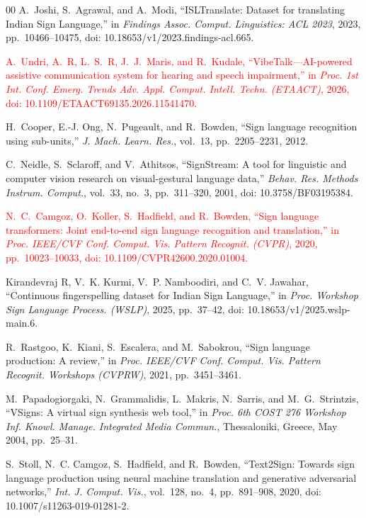 \documentclass[conference,a4paper,10pt]{IEEEtran}
\begin{document}
\begin{thebibliography}{00}
A.~Joshi, S.~Agrawal, and A.~Modi, ``ISLTranslate: Dataset for translating Indian Sign Language,'' in \emph{Findings Assoc. Comput. Linguistics: ACL 2023}, 2023, pp.~10466--10475, doi: 10.18653/v1/2023.findings-acl.665.

\textcolor{red}{A.~Undri, A.~R, L.~S.~R, J.~J.~Maris, and R.~Kudale, ``VibeTalk---AI-powered assistive communication system for hearing and speech impairment,'' in \emph{Proc. 1st Int. Conf. Emerg. Trends Adv. Appl. Comput. Intell. Techn. (ETAACT)}, 2026, doi: 10.1109/ETAACT69135.2026.11541470.}

H.~Cooper, E.-J. Ong, N.~Pugeault, and R.~Bowden, ``Sign language recognition using sub-units,'' \emph{J. Mach. Learn. Res.}, vol.~13, pp.~2205--2231, 2012.

C.~Neidle, S.~Sclaroff, and V.~Athitsos, ``SignStream: A tool for linguistic and computer vision research on visual-gestural language data,'' \emph{Behav. Res. Methods Instrum. Comput.}, vol.~33, no.~3, pp.~311--320, 2001, doi: 10.3758/BF03195384.

\textcolor{red}{N.~C.~Camgoz, O.~Koller, S.~Hadfield, and R.~Bowden, ``Sign language transformers: Joint end-to-end sign language recognition and translation,'' in \emph{Proc. IEEE/CVF Conf. Comput. Vis. Pattern Recognit. (CVPR)}, 2020, pp.~10023--10033, doi: 10.1109/CVPR42600.2020.01004.}

Kirandevraj R, V.~K. Kurmi, V.~P. Namboodiri, and C.~V. Jawahar, ``Continuous fingerspelling dataset for Indian Sign Language,'' in \emph{Proc. Workshop Sign Language Process. (WSLP)}, 2025, pp.~37--42, doi: 10.18653/v1/2025.wslp-main.6.

R.~Rastgoo, K.~Kiani, S.~Escalera, and M.~Sabokrou, ``Sign language production: A review,'' in \emph{Proc. IEEE/CVF Conf. Comput. Vis. Pattern Recognit. Workshops (CVPRW)}, 2021, pp.~3451--3461.

M.~Papadogiorgaki, N.~Grammalidis, L.~Makris, N.~Sarris, and M.~G.~Strintzis, ``VSigns: A virtual sign synthesis web tool,'' in \emph{Proc. 6th COST 276 Workshop Inf. Knowl. Manage. Integrated Media Commun.}, Thessaloniki, Greece, May 2004, pp.~25--31.

S.~Stoll, N.~C. Camgoz, S.~Hadfield, and R.~Bowden, ``Text2Sign: Towards sign language production using neural machine translation and generative adversarial networks,'' \emph{Int. J. Comput. Vis.}, vol.~128, no.~4, pp.~891--908, 2020, doi: 10.1007/s11263-019-01281-2.


\end{thebibliography}
\end{document}
